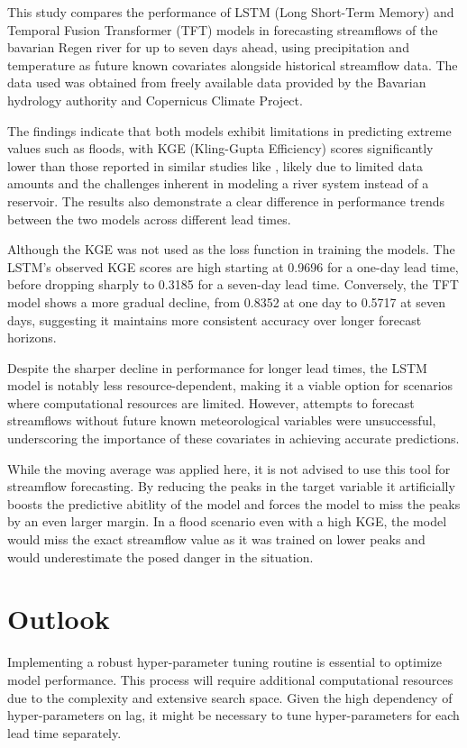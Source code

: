 \documentclass[
]{krantz}
\begin{document}
This study compares the performance of LSTM (Long Short-Term Memory) and Temporal Fusion Transformer (TFT) models in forecasting streamflows of the bavarian Regen river for up to seven days ahead, using precipitation and temperature as future known covariates alongside historical streamflow data. The data used was obtained from freely available data provided by the Bavarian hydrology authority and Copernicus Climate Project.

The findings indicate that both models exhibit limitations in predicting extreme values such as floods, with KGE (Kling-Gupta Efficiency) scores significantly lower than those reported in similar studies like \citet{sabzipour}, likely due to limited data amounts and the challenges inherent in modeling a river system instead of a reservoir. The results also demonstrate a clear difference in performance trends between the two models across different lead times.

Although the KGE was not used as the loss function in training the models. The LSTM's observed KGE scores are high starting at 0.9696 for a one-day lead time, before dropping sharply to 0.3185 for a seven-day lead time. Conversely, the TFT model shows a more gradual decline, from 0.8352 at one day to 0.5717 at seven days, suggesting it maintains more consistent accuracy over longer forecast horizons.

Despite the sharper decline in performance for longer lead times, the LSTM model is notably less resource-dependent, making it a viable option for scenarios where computational resources are limited. However, attempts to forecast streamflows without future known meteorological variables were unsuccessful, underscoring the importance of these covariates in achieving accurate predictions.

While the moving average was applied here, it is not advised to use this tool for streamflow forecasting. By reducing the peaks in the target variable it artificially boosts the predictive abitlity of the model and forces the model to miss the peaks by an even larger margin. In a flood scenario even with a high KGE, the model would miss the exact streamflow value as it was trained on lower peaks and would underestimate the posed danger in the situation.

\section{Outlook}\label{outlook}

Implementing a robust hyper-parameter tuning routine is essential to optimize model performance. This process will require additional computational resources due to the complexity and extensive search space. Given the high dependency of hyper-parameters on lag, it might be necessary to tune hyper-parameters for each lead time separately.
\end{document}
